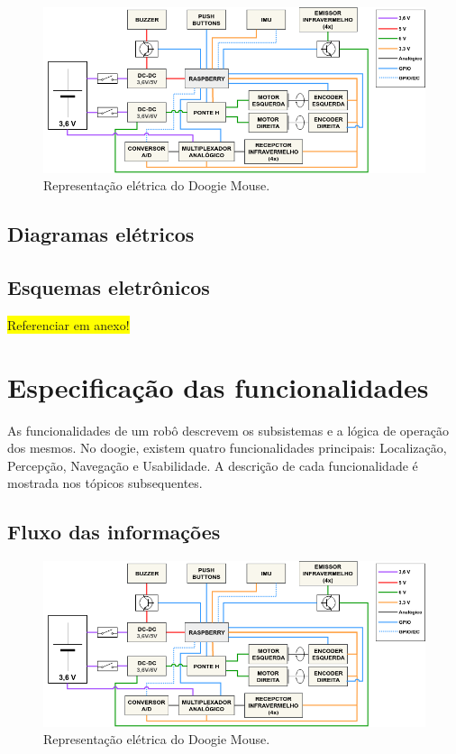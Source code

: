 \begin{figure}[H]
	\label{fig:arquitetura_eletrica}
	\centering
	\caption{Representação elétrica do Doogie Mouse.}
	\includegraphics[width=1\textwidth]
	{Figures/arquitetura_eletrica}
\end{figure}

\subsection{Diagramas elétricos}
\label{sec:diagramas_eletricos}


\subsection{Esquemas eletrônicos}
\label{ssec:esquematicos_eletronicos}
\colorbox{yellow}{Referenciar em anexo!}

\section{Especificação das funcionalidades}
\label{sec:especificacao_das_funcionalidades}
As funcionalidades de um robô descrevem os subsistemas e a lógica de operação dos mesmos. No doogie, existem quatro funcionalidades principais: Localização, Percepção, Navegação e Usabilidade. A descrição de cada funcionalidade é mostrada nos tópicos subsequentes.

\subsection{Fluxo das informações}
\label{ssec:fluxo_das_informacoes}

\begin{figure}[H]
	\label{fig:arquitetura_eletrica}
	\centering
	\caption{Representação elétrica do Doogie Mouse.}
	\includegraphics[width=1\textwidth]
	{Figures/arquitetura_eletrica}
\end{figure}

